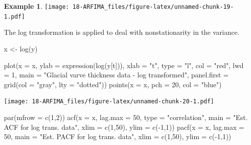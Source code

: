 \documentclass[
]{book}
\newenvironment{Shaded}{\begin{snugshade}}{\end{snugshade}}
\newcommand{\AttributeTok}[1]{\textcolor[rgb]{0.77,0.63,0.00}{#1}}
\newcommand{\DecValTok}[1]{\textcolor[rgb]{0.00,0.00,0.81}{#1}}
\newcommand{\FunctionTok}[1]{\textcolor[rgb]{0.00,0.00,0.00}{#1}}
\newcommand{\NormalTok}[1]{#1}
\newcommand{\OtherTok}[1]{\textcolor[rgb]{0.56,0.35,0.01}{#1}}
\newcommand{\SpecialCharTok}[1]{\textcolor[rgb]{0.00,0.00,0.00}{#1}}
\newcommand{\StringTok}[1]{\textcolor[rgb]{0.31,0.60,0.02}{#1}}
\theoremstyle{definition}
\theoremstyle{definition}
\newtheorem{example}{Example}[chapter]
\theoremstyle{definition}
\theoremstyle{definition}
\theoremstyle{remark}
\begin{document}
\begin{example}
\texttt{[image: 18-ARFIMA\_files/figure-latex/unnamed-chunk-19-1.pdf]}

The log transformation is applied to deal with nonstationarity in the variance.

\begin{Shaded}
\begin{Highlighting}[]
\NormalTok{x }\OtherTok{\textless{}{-}} \FunctionTok{log}\NormalTok{(y)}

\FunctionTok{plot}\NormalTok{(}\AttributeTok{x =}\NormalTok{ x, }\AttributeTok{ylab =} \FunctionTok{expression}\NormalTok{(}\FunctionTok{log}\NormalTok{(y[t])), }\AttributeTok{xlab =} 
      \StringTok{"t"}\NormalTok{, }\AttributeTok{type =} \StringTok{"l"}\NormalTok{, }\AttributeTok{col =} \StringTok{"red"}\NormalTok{, }\AttributeTok{lwd =} \DecValTok{1}\NormalTok{, }\AttributeTok{main =} 
      \StringTok{"Glacial varve thickness data {-} log transformed"}\NormalTok{, }
      \AttributeTok{panel.first =} \FunctionTok{grid}\NormalTok{(}\AttributeTok{col =} \StringTok{"gray"}\NormalTok{, }\AttributeTok{lty =} \StringTok{"dotted"}\NormalTok{))}
\FunctionTok{points}\NormalTok{(}\AttributeTok{x =}\NormalTok{ x, }\AttributeTok{pch =} \DecValTok{20}\NormalTok{, }\AttributeTok{col =} \StringTok{"blue"}\NormalTok{)}
\end{Highlighting}
\end{Shaded}

\texttt{[image: 18-ARFIMA\_files/figure-latex/unnamed-chunk-20-1.pdf]}

\begin{Shaded}
\begin{Highlighting}[]
\FunctionTok{par}\NormalTok{(}\AttributeTok{mfrow =} \FunctionTok{c}\NormalTok{(}\DecValTok{1}\NormalTok{,}\DecValTok{2}\NormalTok{))}
\FunctionTok{acf}\NormalTok{(}\AttributeTok{x =}\NormalTok{ x, }\AttributeTok{lag.max =} \DecValTok{50}\NormalTok{, }\AttributeTok{type =} \StringTok{"correlation"}\NormalTok{, }
    \AttributeTok{main =} \StringTok{"Est. ACF for log trans. data"}\NormalTok{, }\AttributeTok{xlim =} \FunctionTok{c}\NormalTok{(}\DecValTok{1}\NormalTok{,}\DecValTok{50}\NormalTok{), }
    \AttributeTok{ylim =} \FunctionTok{c}\NormalTok{(}\SpecialCharTok{{-}}\DecValTok{1}\NormalTok{,}\DecValTok{1}\NormalTok{))}
\FunctionTok{pacf}\NormalTok{(}\AttributeTok{x =}\NormalTok{ x, }\AttributeTok{lag.max =} \DecValTok{50}\NormalTok{, }\AttributeTok{main =} \StringTok{"Est. PACF for }
\StringTok{    log trans. data"}\NormalTok{, }\AttributeTok{xlim =} \FunctionTok{c}\NormalTok{(}\DecValTok{1}\NormalTok{,}\DecValTok{50}\NormalTok{), }\AttributeTok{ylim =} \FunctionTok{c}\NormalTok{(}\SpecialCharTok{{-}}\DecValTok{1}\NormalTok{,}\DecValTok{1}\NormalTok{))}
\end{Highlighting}
\end{Shaded}


\end{example}
\end{document}
